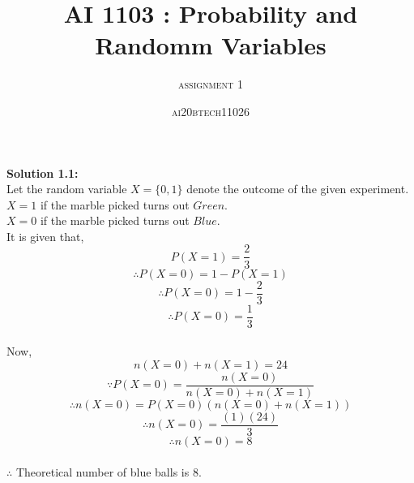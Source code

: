 \documentclass{article}
\title{\textbf{AI 1103 : Probability and Randomm Variables}}
\author{\textsc{assignment 1}}
\date{\textsc{ai20btech11026}}
\begin{document}
\maketitle
\textbf{\large{Solution 1.1:} }
\\\indent Let the random variable $X = \{ 0,1 \}$ denote the outcome of the given experiment.
\\$X = 1$ if the marble picked turns out $Green$.
\\$X = 0$ if the marble picked turns out $Blue$.
\\It is given that,
$$P(X = 1) = \frac{2}{3}$$
$$\therefore{} P(X = 0) = 1 - P(X = 1)$$
$$\therefore{} P(X = 0) = 1 - \frac{2}{3}$$
$$\therefore{} P(X = 0) = \frac{1}{3}$$
\\Now,
$$n(X = 0) + n(X = 1) = 24$$
$$\because P(X = 0) = \frac{n(X = 0)}{n(X = 0) + n(X = 1)}$$
$$\therefore{} n(X = 0) = P(X = 0)\left(n(X = 0) + n(X = 1)\right)$$
$$\therefore{} n(X = 0) = \frac{(1) (24)}{3}$$
$$\therefore{} n(X = 0) = 8$$
\\$\therefore{}$ Theoretical number of blue balls is $8$.
\end{document}
